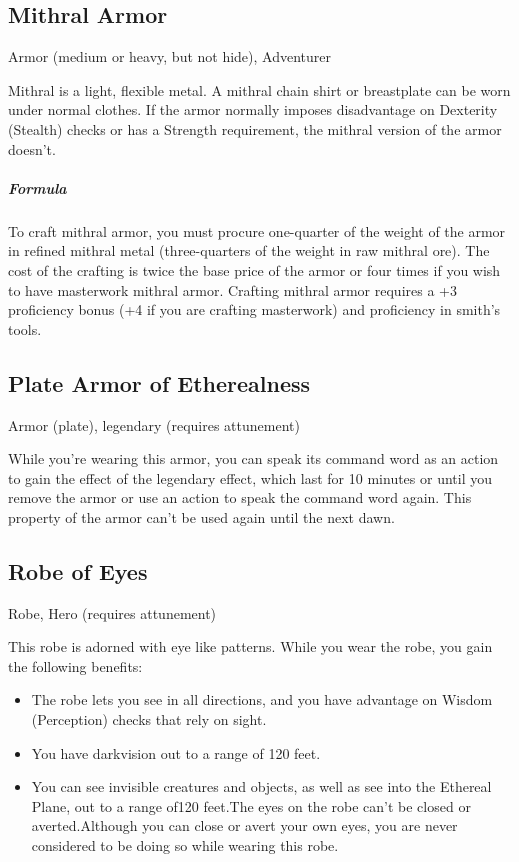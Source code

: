 \subsection{Mithral Armor}
Armor (medium or heavy, but not hide), Adventurer 

Mithral is a light, flexible metal. A mithral chain shirt or breastplate can be worn under normal clothes. If the armor normally imposes disadvantage on Dexterity (Stealth) checks or has a Strength requirement, the mithral version of the armor doesn't.

\subparagraph*{Formula} To craft mithral armor, you must procure one-quarter of the weight of the armor in refined mithral metal (three-quarters of the weight in raw mithral ore). The cost of the crafting is twice the base price of the armor or four times if you wish to have masterwork mithral armor. Crafting mithral armor requires a +3 proficiency bonus (+4 if you are crafting masterwork) and proficiency in smith's tools.

\subsection{Plate Armor of Etherealness}
Armor (plate), legendary (requires attunement) 

While you're wearing this armor, you can speak its command word as an action to gain the effect of the  legendary effect, which last for 10 minutes or until you remove the armor or use an action to speak the command word again. This property of the armor can't be used again until the next dawn.

\subsection{Robe of Eyes}
Robe, Hero (requires attunement)

This robe is adorned with eye like patterns. While you wear the robe, you gain the following benefits:
\begin{itemize}
 \item The robe lets you see in all directions, and you have advantage on Wisdom (Perception) checks that rely on sight.
 \item You have darkvision out to a range of 120 feet.
 \item You can see invisible creatures and objects, as well as see into the Ethereal Plane, out to a range of120 feet.The eyes on the robe can't be closed or averted.Although you can close or avert your own eyes, you are never considered to be doing so while wearing this robe.
\end{itemize}

